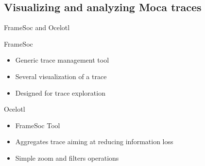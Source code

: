\documentclass[xcolor={usenames,dvipsnames},hyperref={pdfusetitle}]{beamer}
\begin{document}
\subsection*{Visualizing and analyzing Moca traces}

\setcounter{framenumber}{\value{finalframe}}
\begin{frame}{FrameSoc and Ocelotl}
    \begin{block}{FrameSoc~\cite{Pagano14frameSoC}}
        \begin{itemize}
            \item Generic trace management tool
            \item Several visualization of a trace
            \item Designed for trace exploration
        \end{itemize}
    \end{block}
    \pause
    \begin{alertblock}{Ocelotl~\cite{Dosimont14Ocelotl}}
        \begin{itemize}
            \item FrameSoc Tool
            \item Aggregates trace aiming at reducing information loss
            \item Simple zoom and filters operations
        \end{itemize}
    \end{alertblock}
\end{frame}
\end{document}
